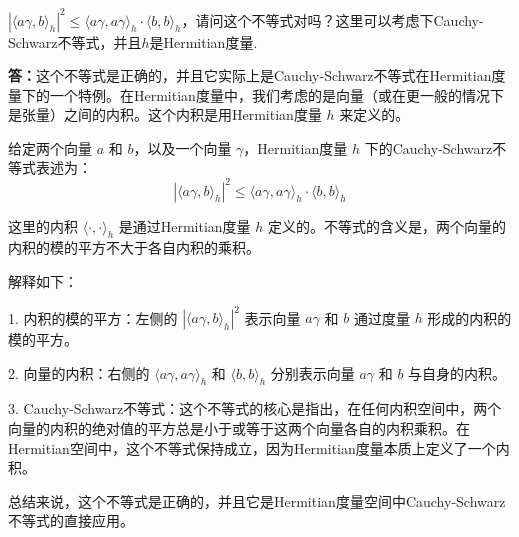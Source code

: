 \begin{remark}
  $|\langle a\gamma,b\rangle_h|^2\leqslant \langle a\gamma,a\gamma\rangle_h\cdot \langle b,b\rangle_h$，请问这个不等式对吗？这里可以考虑下Cauchy-Schwarz不等式，并且$h$是Hermitian度量. 

  \textbf{答：}这个不等式是正确的，并且它实际上是Cauchy-Schwarz不等式在Hermitian度量下的一个特例。在Hermitian度量中，我们考虑的是向量（或在更一般的情况下是张量）之间的内积。这个内积是用Hermitian度量 \( h \) 来定义的。

  给定两个向量 \( a \) 和 \( b \)，以及一个向量 \( \gamma \)，Hermitian度量 \( h \) 下的Cauchy-Schwarz不等式表述为：
  \[ |\langle a\gamma, b\rangle_h|^2 \leq \langle a\gamma, a\gamma\rangle_h \cdot \langle b, b\rangle_h \]
  
  这里的内积 \( \langle \cdot, \cdot \rangle_h \) 是通过Hermitian度量 \( h \) 定义的。不等式的含义是，两个向量的内积的模的平方不大于各自内积的乘积。
  
  解释如下：
  
  1. 内积的模的平方：左侧的 \( |\langle a\gamma, b\rangle_h|^2 \) 表示向量 \( a\gamma \) 和 \( b \) 通过度量 \( h \) 形成的内积的模的平方。
  
  2. 向量的内积：右侧的 \( \langle a\gamma, a\gamma\rangle_h \) 和 \( \langle b, b\rangle_h \) 分别表示向量 \( a\gamma \) 和 \( b \) 与自身的内积。
  
  3. Cauchy-Schwarz不等式：这个不等式的核心是指出，在任何内积空间中，两个向量的内积的绝对值的平方总是小于或等于这两个向量各自的内积乘积。在Hermitian空间中，这个不等式保持成立，因为Hermitian度量本质上定义了一个内积。
  
  总结来说，这个不等式是正确的，并且它是Hermitian度量空间中Cauchy-Schwarz不等式的直接应用。
\end{remark}

